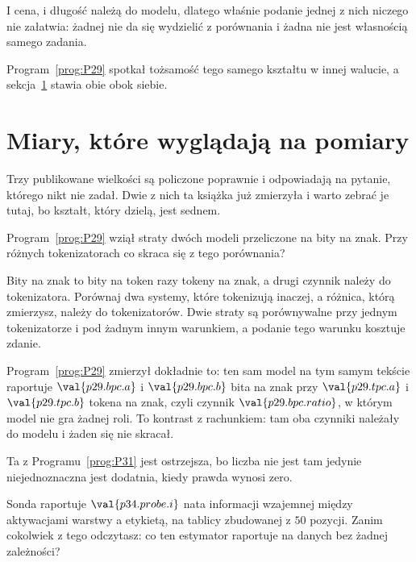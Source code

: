 \begin{fr}
I cena, i długość należą do modelu, dlatego właśnie podanie jednej z nich
niczego nie załatwia: żadnej nie da się wydzielić z porównania i żadna nie
jest własnością samego zadania.

Program~\ref{prog:P29} spotkał tożsamość tego samego kształtu w innej
walucie, a sekcja~\ref{sec:P34-measures} stawia obie obok siebie.

\end{fr}

\section{Miary, które wyglądają na pomiary}
\label{sec:P34-measures}

\begin{fr}
Trzy publikowane wielkości są policzone poprawnie i odpowiadają na pytanie,
którego nikt nie zadał. Dwie z nich ta książka już zmierzyła i warto zebrać
je tutaj, bo kształt, który dzielą, jest sednem.

Program~\ref{prog:P29} wziął straty dwóch modeli przeliczone na bity na znak.
Przy różnych tokenizatorach co skraca się z tego porównania?
\dotline
\nextframe
\end{fr}

\begin{fr}

Bity na znak to bity na token razy tokeny na znak, a drugi czynnik należy do
tokenizatora. Porównaj dwa systemy, które tokenizują inaczej, a różnica,
którą zmierzysz, należy do tokenizatorów. Dwie straty są porównywalne przy
jednym tokenizatorze i pod żadnym innym warunkiem, a podanie tego warunku
kosztuje zdanie.

Program~\ref{prog:P29} zmierzył dokładnie to: ten sam model na tym samym
tekście raportuje $\val{p29.bpc.a}$ i $\val{p29.bpc.b}$ bita na znak przy
$\val{p29.tpc.a}$ i $\val{p29.tpc.b}$ tokena na znak, czyli czynnik
$\val{p29.bpc.ratio}$, w którym model nie gra żadnej roli. To kontrast z
rachunkiem: tam oba czynniki należały do modelu i żaden się nie skracał.
\end{fr}

\begin{fr}
Ta z Programu~\ref{prog:P31} jest ostrzejsza, bo liczba nie jest tam jedynie
niejednoznaczna \dash{} jest dodatnia, kiedy prawda wynosi zero.

Sonda raportuje $\val{p34.probe.i}$ nata informacji wzajemnej między
aktywacjami warstwy a etykietą, na tablicy zbudowanej z $50$ pozycji. Zanim
cokolwiek z tego odczytasz: co ten estymator raportuje na danych bez żadnej
zależności?
\dotline
\nextframe
\end{fr}


